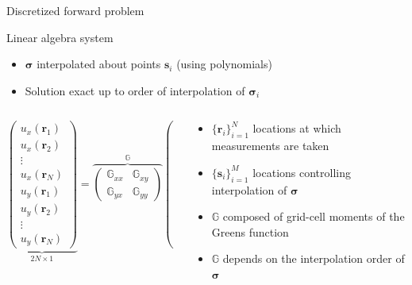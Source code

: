 \documentclass[presentation,aspectratio=169]{beamer}
\newcommand{\br}{\mathbf{r}}
\newcommand{\bs}{\mathbf{s}}
\begin{document}
\begin{frame}{Discretized forward problem}
 \small
\begin{block}{Linear algebra system}
\begin{itemize}
\item $\boldsymbol\sigma$ interpolated about points $\bs_i$ (using polynomials)
\item Solution exact up to order of interpolation of $\boldsymbol\sigma_i$
\end{itemize}
\begin{columns}
\begin{column}{0.55\textwidth}
\[
\underbrace{\left(\begin{matrix} 
u_{x}({\br_1} )\\
u_x({\br_2} ) \\
\vdots \\
u_x({\br_N} ) \\
u_{y}({\br_1} )\\
u_y({\br_2} ) \\
\vdots \\
u_y({\br_N} )
\end{matrix}\right)}_{2N\times1} =
\overbrace{\left(\begin{matrix}
\mathbb{G}_{xx} & \mathbb{G}_{xy} \\
\mathbb{G}_{yx} & \mathbb{G}_{yy}
\end{matrix}\right)}^{\mathbb{G}}
\underbrace{\left(\begin{matrix} 
\sigma_{xz}({\bs_1} )\\
\sigma_{xz}({\bs_2} ) \\
\vdots \\
\sigma_{xz}({\bs_M} ) \\
\sigma_{yz}({\bs_1} )\\
\sigma_{yz}({\bs_2} ) \\
\vdots \\
\sigma_{yz}({\bs_M} )
\end{matrix}\right)}_{2M\times1} 
\]
\end{column}
\begin{column}{0.4\textwidth}
\begin{itemize}
\item $\{\mathbf{r}_i\}_{i=1}^N$  locations at which measurements are taken
\item $\{\mathbf{s}_i\}_{i=1}^M$  locations controlling interpolation of $\boldsymbol\sigma$
\item $\mathbb{G}$ composed of grid-cell moments of the Greens function
\item  $\mathbb{G}$ depends on the interpolation order of $\boldsymbol\sigma$
\end{itemize}
\end{column}
\end{columns}
\end{block}
\end{frame}
\end{document}
